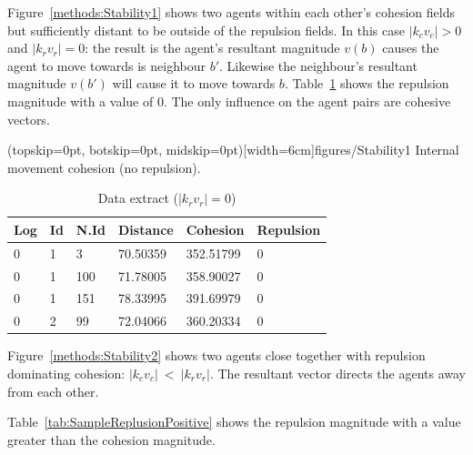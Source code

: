 \documentclass{ieeeaccess}
\begin{document}
Figure~\ref{methods:Stability1} shows two agents within each other's cohesion fields but sufficiently distant to be outside of the repulsion fields. In this case $|k_cv_c| > 0$ and $|k_rv_r| = 0$: the result is the agent's resultant magnitude $v(b)$ causes the agent to move towards is neighbour $b'$. Likewise the neighbour's resultant magnitude $v(b')$ will cause it to move towards $b$. Table~\ref{tab:SampleReplusion0} shows the repulsion magnitude with a value of 0. The only influence on the agent pairs are cohesive vectors. 

\Figure[t!](topskip=0pt, botskip=0pt, midskip=0pt)[width=6cm]{figures/Stability1}
{Internal movement cohesion (no repulsion).\label{methods:Stability1}}


\begin{table}[H]
\begin{center}
\begin{tabular}{| l | l | l | l | l | l |}
\hline
Log &	Id &	N.Id &	Distance &	{\color{green}Cohesion} &	{\color{red}Repulsion} 	\\ \hline
0 &	1 &	3 	 & 70.50359 &	{\color{green}352.51799} &	{\color{red}0} \\ \hline
0 &	1 &	100 & 71.78005 &	{\color{green}358.90027} &	{\color{red}0} \\ \hline
0 &	1 &	151 & 78.33995 &	{\color{green}391.69979} &	{\color{red}0} \\ \hline
0 &	2 &	99  &	72.04066 &	{\color{green}360.20334} &	{\color{red}0} \\ 
\hline
\end{tabular}\caption{Data extract ($|k_rv_r| = 0$)} \label{tab:SampleReplusion0}
\end{center}
\end{table}

Figure~\ref{methods:Stability2} shows two agents close together with repulsion dominating cohesion: $|k_cv_c|~<~|k_rv_r|$. The resultant vector directs the agents away from each other. 

Table~\ref{tab:SampleReplusionPositive} shows the repulsion magnitude with a value greater than the cohesion magnitude.
\end{document}
